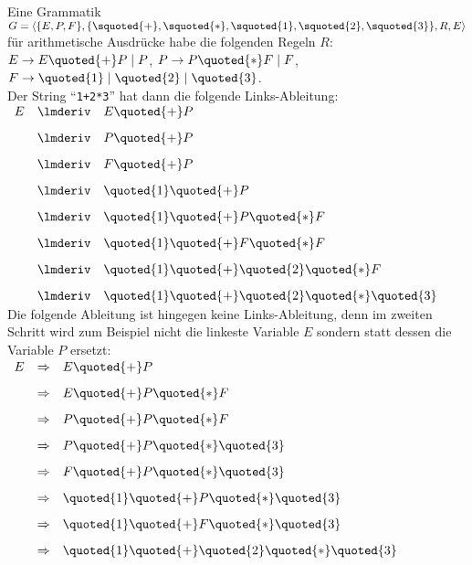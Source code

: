\example
Eine Grammatik 
$G = \langle \{ E, P, F\}, \{ \squoted{+}, \squoted{*}, \squoted{1}, \squoted{2}, \squoted{3} \}, R, E \rangle$ 
f\"ur arithmetische Ausdr\"ucke habe die folgenden Regeln $R$:
\\[0.2cm]
\hspace*{1.3cm}
$E \rightarrow E \quoted{+} P \;|\; P$, \quad
$P \rightarrow P \quoted{*} F \;|\; F$, \quad
$F \rightarrow \quoted{1} \;|\; \quoted{2} \;|\; \quoted{3}$.
\\[0.2cm]
Der String ``\texttt{1+2*3}'' hat dann die folgende Links-Ableitung:
\\[0.2cm]
\hspace*{1.3cm}
$
\begin{array}[t]{lcl}
  E & \lmderiv & E \quoted{+} P \\[0.3cm]
    & \lmderiv & P \quoted{+} P \\[0.3cm]
    & \lmderiv & F \quoted{+} P \\[0.3cm]
    & \lmderiv & \quoted{1} \quoted{+} P \\[0.3cm]
    & \lmderiv & \quoted{1} \quoted{+} P \quoted{*} F \\[0.3cm]
    & \lmderiv & \quoted{1} \quoted{+} F \quoted{*} F \\[0.3cm]
    & \lmderiv & \quoted{1} \quoted{+} \quoted{2} \quoted{*} F \\[0.3cm]
    & \lmderiv & \quoted{1} \quoted{+} \quoted{2} \quoted{*} \quoted{3} 
\end{array}
$
\\[0.2cm]
Die folgende Ableitung ist hingegen keine Links-Ableitung, denn im zweiten Schritt wird
zum Beispiel nicht die linkeste Variable $E$ sondern statt dessen die Variable $P$ ersetzt:
\\[0.2cm]
\hspace*{1.3cm}
$
\begin{array}[t]{lcl}
  E & \Rightarrow & E \quoted{+} P \\[0.3cm]
    & \Rightarrow & E \quoted{+} P \quoted{*} F \\[0.3cm]
    & \Rightarrow & P \quoted{+} P \quoted{*} F \\[0.3cm]
    & \Rightarrow & P \quoted{+} P \quoted{*} \quoted{3} \\[0.3cm]
    & \Rightarrow & F \quoted{+} P \quoted{*} \quoted{3} \\[0.3cm]
    & \Rightarrow & \quoted{1} \quoted{+} P \quoted{*} \quoted{3} \\[0.3cm]
    & \Rightarrow & \quoted{1} \quoted{+} F \quoted{*} \quoted{3} \\[0.3cm]
    & \Rightarrow & \quoted{1} \quoted{+} \quoted{2} \quoted{*} \quoted{3}  \\[0.3cm]
\end{array}
$

